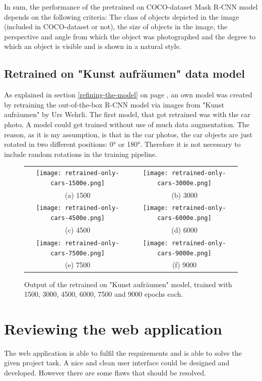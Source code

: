 In sum, the performance of the pretrained on COCO-dataset Mask R-CNN model depends on the following criteria: The class of objects depicted in the image (included in COCO-dataset or not), the size of objects in the image, the perspective and angle from which the object was photographed and the degree to which an object is visible and is shown in a natural style.

\subsection{Retrained on "Kunst aufräumen" data model}

As explained in section \ref{refining-the-model} on page \pageref{refining-the-model}, an own model was created by retraining the out-of-the-box R-CNN model via images from "Kunst aufräumen" by Urs Wehrli. The first model, that got retrained was with the car photo. A model could get trained without use of much data augmentation. The reason, as it is my assumption, is that in the car photos, the car objects are just rotated in two different positions: 0\si{\degree} or 180\si{\degree}. Therefore it is not necessary to include random rotations in the training pipeline.

\begin{figure}[H]
\begin{tabular}{cc}
 \texttt{[image: retrained-only-cars-1500e.png]} &   \texttt{[image: retrained-only-cars-3000e.png]} \\
 (a) 1500 & (b) 3000 \\[6pt]
 \texttt{[image: retrained-only-cars-4500e.png]} &   \texttt{[image: retrained-only-cars-6000e.png]} \\
(c) 4500 & (d) 6000 \\[6pt]
 \texttt{[image: retrained-only-cars-7500e.png]} &   \texttt{[image: retrained-only-cars-9000e.png]} \\
(e) 7500 & (f) 9000 \\[6pt]
\end{tabular}
\caption{Output of the retrained on "Kunst aufräumen" model, trained with 1500, 3000, 4500, 6000, 7500 and 9000 epochs each.}
\label{fig:epochs-output}
\end{figure}

\section{Reviewing the web application}

The web application is able to fulfil the requirements and is able to solve the given project task. A nice and clean user interface could be designed and developed. However there are some flaws that should be resolved.

